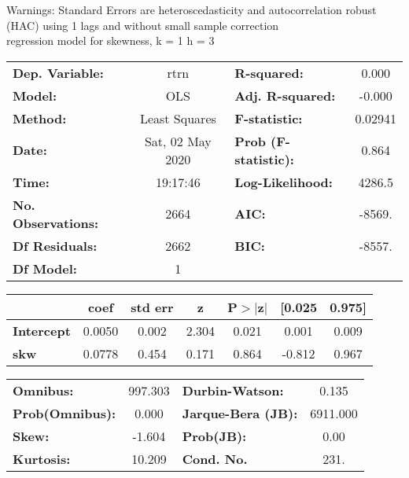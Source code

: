 Warnings: \newline
 [1] Standard Errors are heteroscedasticity and autocorrelation robust (HAC) using 1 lags and without small sample correction\\ 

regression model for skewness, k = 1 h = 3\begin{center}
\begin{tabular}{lclc}
\toprule
\textbf{Dep. Variable:}    &       rtrn       & \textbf{  R-squared:         } &     0.000   \\
\textbf{Model:}            &       OLS        & \textbf{  Adj. R-squared:    } &    -0.000   \\
\textbf{Method:}           &  Least Squares   & \textbf{  F-statistic:       } &   0.02941   \\
\textbf{Date:}             & Sat, 02 May 2020 & \textbf{  Prob (F-statistic):} &    0.864    \\
\textbf{Time:}             &     19:17:46     & \textbf{  Log-Likelihood:    } &    4286.5   \\
\textbf{No. Observations:} &        2664      & \textbf{  AIC:               } &    -8569.   \\
\textbf{Df Residuals:}     &        2662      & \textbf{  BIC:               } &    -8557.   \\
\textbf{Df Model:}         &           1      & \textbf{                     } &             \\
\bottomrule
\end{tabular}
\begin{tabular}{lcccccc}
                   & \textbf{coef} & \textbf{std err} & \textbf{z} & \textbf{P$> |$z$|$} & \textbf{[0.025} & \textbf{0.975]}  \\
\midrule
\textbf{Intercept} &       0.0050  &        0.002     &     2.304  &         0.021        &        0.001    &        0.009     \\
\textbf{skw}       &       0.0778  &        0.454     &     0.171  &         0.864        &       -0.812    &        0.967     \\
\bottomrule
\end{tabular}
\begin{tabular}{lclc}
\textbf{Omnibus:}       & 997.303 & \textbf{  Durbin-Watson:     } &    0.135  \\
\textbf{Prob(Omnibus):} &   0.000 & \textbf{  Jarque-Bera (JB):  } & 6911.000  \\
\textbf{Skew:}          &  -1.604 & \textbf{  Prob(JB):          } &     0.00  \\
\textbf{Kurtosis:}      &  10.209 & \textbf{  Cond. No.          } &     231.  \\
\bottomrule
\end{tabular}
\end{center}

